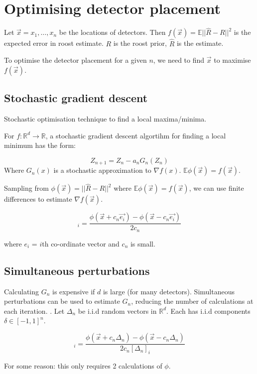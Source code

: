 
\section{Optimising detector placement}

Let $\vec{x} = x_1, \dots, x_n$ be the locations of detectors. Then $f(\vec{x})
= \mathbb{E} \lvert \lvert \hat{R} - R \rvert \rvert^2$ is the expected error in
roost estimate. $R$ is the roost prior, $\hat{R}$ is the estimate. 

To optimise the detector placement for a given $n$, we need to find $\vec{x}$ to
maximise $f(\vec{x})$.

\subsection{Stochastic gradient descent}

Stochastic optimisation technique to find a local maxima/minima. 


For $f : \mathbb{R}^d \rightarrow \mathbb{R}$, a stochastic gradient descent
algortihm for finding a local minimum has the form: 

\begin{equation}
Z_{n+1} = Z_n - a_n G_n(Z_n)
\end{equation}
Where $G_n(x)$ is a stochastic approximation to $\nabla f(x)$. $\mathbb{E}
\phi(\vec{x}) = f(\vec{x})$.

Sampling from $\phi(\vec{x}) = \lvert \lvert \hat{R} - R \rvert \rvert^2$ where
$\mathbb{E} \phi(\vec{x}) = f(\vec{x})$, we can use finite differences to
estimate $\nabla f(\vec{x}).$

\begin{equation} 
[G_n(\vec{x})]_i = \frac{\phi(\vec{x} + c_n \vec{e_i}) - \phi(\vec{x} - c_n \vec{e_i})}{2c_n}
\end{equation}

where $e_i$ = $i$th co-ordinate vector and $c_n$ is small. 


\subsection{Simultaneous perturbations}

Calculating $G_n$ is expensive if $d$ is large (for many detectors).
Simultaneous perturbations can be used to estimate $G_n$, reducing the number of
calculations at each iteration. \cite{Spall1998}. Let $\Delta _n$ be i.i.d
random vectors in $\mathbb{R}^d$. Each has i.i.d components $\delta \in [-1,
1]^n$. 

\begin{equation} 
    [G_n(\vec{x})]_i = \frac{\phi(\vec{x} + c_n \Delta_n) - \phi(\vec{x} - c_n \Delta_n)}{2c_n[\Delta_n]_i}
\end{equation}


For some reason: this only requires 2 calculations of $\phi$.

